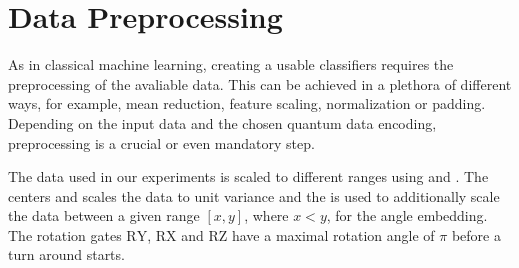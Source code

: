 \section{Data Preprocessing}
As in classical machine learning, creating a usable classifiers requires the preprocessing of the avaliable data. This can be achieved in a plethora of different ways, for example, mean reduction, feature scaling, normalization or padding. Depending on the input data and the chosen quantum data encoding, preprocessing is a crucial or even mandatory step\cite{PoincarDataPreprocessinForQuantumMachineLearning_2021,VariationalClassifierPennyLane,SHRIVASTAVA20201849}. 

The data used in our experiments is scaled to different ranges using  \cite{scikit_sklearnpreprocessingminmaxscaler_nodate} and \cite{scikit_sklearnpreprocessingstandardscaler_nodate}. The  centers and scales the data to unit variance and the  is used to additionally scale the data between a given range $[x, y]$, where $x < y$, for the angle embedding. The rotation gates $\mathrm{RY}$, $\mathrm{RX}$ and $\mathrm{RZ}$ have a maximal rotation angle of $\pi$ before a turn around starts.

